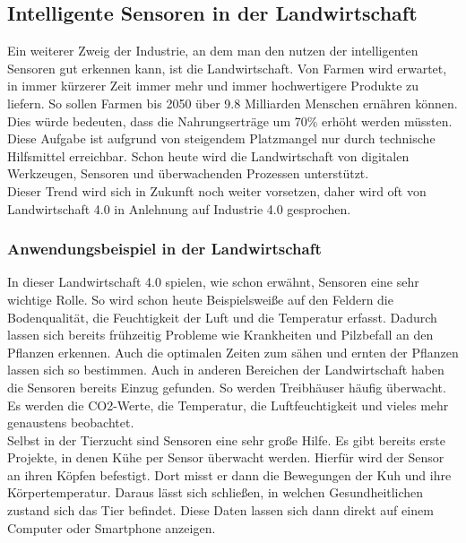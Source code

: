 \documentclass[a4paper,12pt]{scrartcl}
\begin{document}
\subsection{Intelligente Sensoren in der Landwirtschaft}
Ein weiterer Zweig der Industrie, an dem man den nutzen der intelligenten Sensoren gut erkennen kann, ist die Landwirtschaft. 
Von Farmen wird erwartet, in immer kürzerer Zeit immer mehr und immer hochwertigere Produkte zu liefern. So sollen Farmen bis 2050 über 9.8 Milliarden Menschen ernähren können.\cite{Technology: The Future of Agriculture Seite 21}\\
Dies würde bedeuten, dass die Nahrungserträge um 70\% erhöht werden müssten. \cite{Agricultural Management through Wireless Sensors and Internet of Things, Seite 1}
Diese Aufgabe ist aufgrund von steigendem Platzmangel nur durch technische Hilfsmittel erreichbar. Schon heute wird die Landwirtschaft von digitalen Werkzeugen, Sensoren und überwachenden Prozessen unterstützt.\cite{(Research and development in agricultural robotics: A perspective of digital farming, Seite 1)}\\
Dieser Trend wird sich in Zukunft noch weiter vorsetzen, daher wird oft von Landwirtschaft 4.0 in Anlehnung auf Industrie 4.0 gesprochen.

\subsubsection{Anwendungsbeispiel in der Landwirtschaft}
In dieser Landwirtschaft 4.0 spielen, wie schon erwähnt, Sensoren eine sehr wichtige Rolle. So wird schon heute Beispielsweiße auf den Feldern die Bodenqualität, die Feuchtigkeit der Luft und die Temperatur erfasst. Dadurch lassen sich bereits frühzeitig Probleme wie Krankheiten und Pilzbefall an den Pflanzen erkennen. Auch die optimalen Zeiten zum sähen und ernten der Pflanzen lassen sich so bestimmen. Auch in anderen Bereichen der Landwirtschaft haben die Sensoren bereits Einzug gefunden. So werden Treibhäuser häufig überwacht. Es werden die CO2-Werte, die Temperatur, die Luftfeuchtigkeit und vieles mehr genaustens beobachtet. \cite{Agricultural Management through Wireless Sensors and Internet of Things, Seite 2}\\
Selbst in der Tierzucht sind Sensoren eine sehr große Hilfe. Es gibt bereits erste Projekte, in denen Kühe per Sensor überwacht werden. Hierfür wird der Sensor an ihren Köpfen befestigt. Dort misst er dann die Bewegungen der Kuh und ihre Körpertemperatur. Daraus lässt sich schließen, in welchen Gesundheitlichen zustand sich das Tier befindet. Diese Daten lassen sich dann direkt auf einem Computer oder Smartphone anzeigen.
\cite{https://www.cowlar.com/howItWorks Stand 14.02.2019, 13:00 Uhr}
\end{document}
